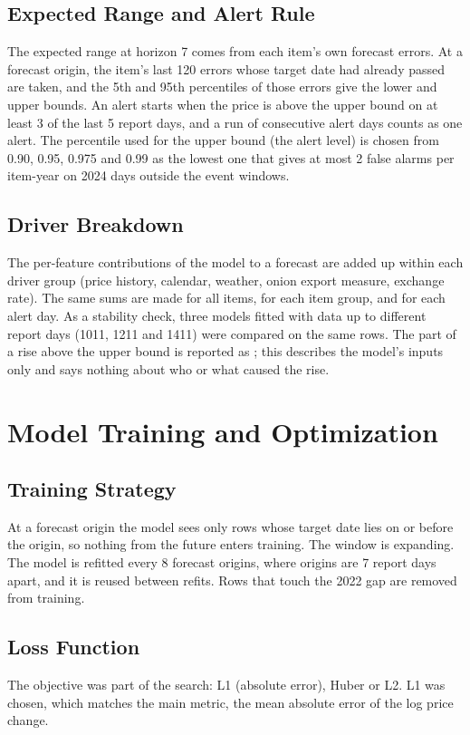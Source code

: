 \subsection{Expected Range and Alert Rule}
The expected range at horizon 7 comes from each item's own forecast errors. At a forecast origin, the item's last 120 errors whose target date had already passed are taken, and the 5th and 95th percentiles of those errors give the lower and upper bounds. An alert starts when the price is above the upper bound on at least 3 of the last 5 report days, and a run of consecutive alert days counts as one alert. The percentile used for the upper bound (the alert level) is chosen from 0.90, 0.95, 0.975 and 0.99 as the lowest one that gives at most 2 false alarms per item-year on 2024 days outside the event windows.

\subsection{Driver Breakdown}
The per-feature contributions of the model to a forecast are added up within each driver group (price history, calendar, weather, onion export measure, exchange rate). The same sums are made for all items, for each item group, and for each alert day. As a stability check, three models fitted with data up to different report days (1011, 1211 and 1411) were compared on the same rows. The part of a rise above the upper bound is reported as \unexpl; this describes the model's inputs only and says nothing about who or what caused the rise.

\section{Model Training and Optimization}

\subsection{Training Strategy}
At a forecast origin the model sees only rows whose target date lies on or before the origin, so nothing from the future enters training. The window is expanding. The model is refitted every 8 forecast origins, where origins are 7 report days apart, and it is reused between refits. Rows that touch the 2022 gap are removed from training.

\subsection{Loss Function}
The objective was part of the search: L1 (absolute error), Huber or L2. L1 was chosen, which matches the main metric, the mean absolute error of the log price change.

